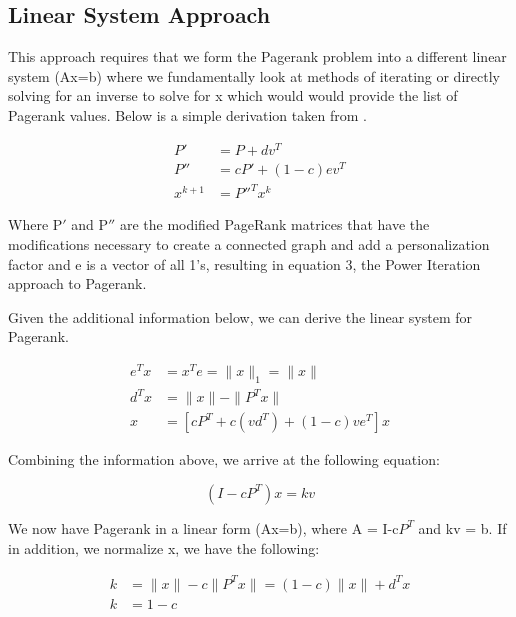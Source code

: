 \documentclass[letterpaper,11pt,onecolumn]{article}
\begin{document}
\subsection{Linear System Approach}
This approach requires that we form the Pagerank problem into a different linear system (Ax=b) where we fundamentally look at methods of iterating or directly solving for an inverse to solve for x which would would provide the list of Pagerank values. Below is a simple derivation taken from \cite{FastParallel}.
\begin{center}
\begin{align}
	P' &= P + dv^{T} \\
	P'' &= cP' + (1-c)ev^{T} \\
	x^{k+1} &= P''^{T}x^{k}
\end{align}

\end{center}
Where P$'$ and P$''$ are the modified PageRank matrices that have the modifications necessary to create a connected graph and add a personalization factor and e is a vector of all 1's, resulting in equation 3, the Power Iteration approach to Pagerank.


Given the additional information below, we can derive the linear system for Pagerank.

\begin{center}
\begin{align}
  e^{T}x & = x^{T}e = \|x\|_{1} = \|x\| \\
  d^{T}x &= \| x\| - \| P^{T}x\| \\
  x &= [cP^{T} + c(vd^{T}) + (1-c)ve^{T}]x
\end{align}
\end{center}

\noindent Combining the information above, we arrive at the following equation:

\begin{center}
\begin{equation}
  (I-cP^{T})x = kv
\end{equation}
\end{center}

We now have Pagerank in a linear form (Ax=b), where A = I-c$P^{T}$ and kv = b. If in addition, we normalize x, we have the following:

\begin{center}
  \begin{align}
	k &= \|x\| - c \|P^{T}x\| = (1-c) \|x\| + d^{T}x \\	
	k &= 1-c 
  \end{align}
\end{center}
\end{document}
